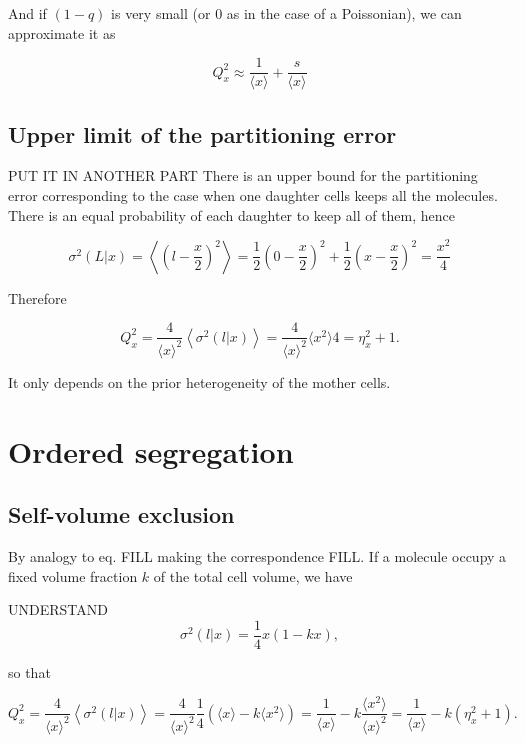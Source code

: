 And if $(1-q)$ is very small (or $0$ as in the case of a Poissonian), we can approximate it as

\begin{equation}
  Q_x^2 \approx \frac{1}{\langle x\rangle} + \frac{s}{\langle x\rangle}
\end{equation}

\subsection{Upper limit of the partitioning error}
PUT IT IN ANOTHER PART
There is an upper bound for the partitioning error corresponding to the case when one daughter cells keeps all the molecules. There is an equal probability of each daughter to keep all of them, hence

\begin{equation}
  \sigma^2(L|x) = \left\langle\left(l-\frac{x}{2}\right)^2\right\rangle = \frac{1}{2}\left(0-\frac{x}{2}\right)^2+\frac{1}{2}\left(x-\frac{x}{2}\right)^2 = \frac{x^2}{4}
\end{equation}

Therefore

\begin{equation}
  Q_x^2 = \frac{4}{\langle x\rangle^2}\left\langle\sigma^2(l|x)\right\rangle = \frac{4}{\langle x\rangle^2}{\langle x^2\rangle}{4} = \eta_x^2+1.
\end{equation}

It only depends on the prior heterogeneity of the mother cells.

\section{Ordered segregation}

\subsection{Self-volume exclusion}

By analogy to eq. FILL making the correspondence FILL. If a molecule occupy a fixed volume fraction $k$ of the total cell volume, we have

UNDERSTAND
\begin{equation}
  \sigma^2(l|x) = \frac{1}{4}x(1-kx),
\end{equation}

so that

\begin{equation}
  Q_x^2 = \frac{4}{\langle x\rangle^2}\left\langle \sigma^2(l|x)\right\rangle = \frac{4}{\langle x\rangle^2}\frac{1}{4}\left(\langle x\rangle-k\langle x^2\rangle\right) = \frac{1}{\langle x\rangle} - k\frac{\langle x^2\rangle}{\langle x\rangle^2} = \frac{1}{\langle x\rangle} - k(\eta_x^2+1).
\end{equation}

